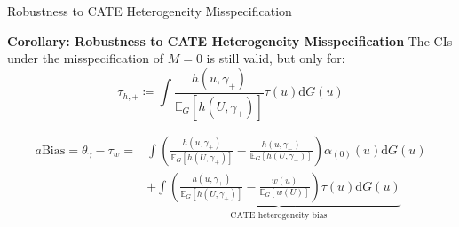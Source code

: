 \begin{frame}{Robustness to CATE Heterogeneity Misspecification}
    \begin{block}{\textbf{Corollary: Robustness to CATE Heterogeneity Misspecification}}
        The CIs under the misspecification of $M=0$ is still valid, but only for:
        $$
        \tau_{h,+}\coloneqq\int\frac{h\left(u,\gamma_{+}\right)}{\mathbb{E}_{G}\left[h\left(U,\gamma_{+}\right)\right]}\tau\left(u\right)\mathrm{d}G\left(u\right)
        $$
    \end{block}

    {\small
    \begin{align*}
        a\mathrm{Bias}=\theta_{\gamma}-\tau_{w}=&\int\left(\frac{h\left(u,\gamma_{+}\right)}{\mathbb{E}_{G}\left[h\left(U,\gamma_{+}\right)\right]}-\frac{h\left(u,\gamma_{-}\right)}{\mathbb{E}_{G}\left[h\left(U,\gamma_{-}\right)\right]}\right)\alpha_{\left(0\right)}\left(u\right)\mathrm{d}G\left(u\right)\\
        &+\underbrace{\int\left(\frac{h\left(u,\gamma_{+}\right)}{\mathbb{E}_{G}\left[h\left(U,\gamma_{+}\right)\right]}- \frac{w\left(u\right)}{\mathbb{E}_{G}\left[w\left(U\right)\right]} \right) \tau\left(u\right)\mathrm{d}G\left(u\right)}_{\text{CATE heterogeneity bias}}
    \end{align*}}
\end{frame}